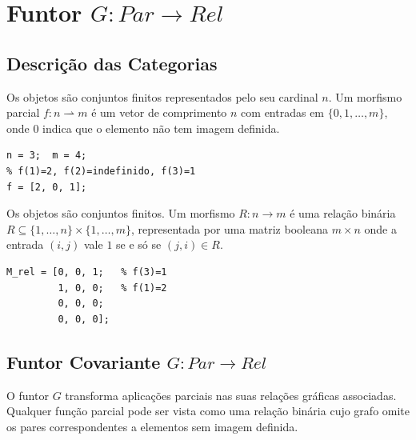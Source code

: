 \section{Funtor \texorpdfstring{$G: Par \to Rel$}{G: Par -> Rel}}
\label{sec:functor-par-rel}

\subsection{Descrição das Categorias}

\begin{definition}
Os objetos são conjuntos finitos representados pelo seu cardinal $n$. Um morfismo parcial $f: n \rightharpoonup m$ é um vetor de comprimento $n$ com entradas em $\{0, 1, \ldots, m\}$, onde $0$ indica que o elemento não tem imagem definida.
\end{definition}

\begin{lstlisting}[style=matlab, caption={Objeto e morfismo em $\mathbf{Par}$}]
n = 3;  m = 4;
% f(1)=2, f(2)=indefinido, f(3)=1
f = [2, 0, 1];
\end{lstlisting}

\begin{definition}
Os objetos são conjuntos finitos. Um morfismo $R: n \to m$ é uma relação binária $R \subseteq \{1,\ldots,n\} \times \{1,\ldots,m\}$, representada por uma matriz booleana $m \times n$ onde a entrada $(i,j)$ vale $1$ se e só se $(j, i) \in R$.
\end{definition}

\begin{lstlisting}[style=matlab, caption={Objeto e morfismo em $\mathbf{Rel}$}]
% Relacao R ⊆ {1,2,3} x {1,2,3,4}: matriz booleana 4x3
M_rel = [0, 0, 1;   % f(3)=1
         1, 0, 0;   % f(1)=2
         0, 0, 0;
         0, 0, 0];
\end{lstlisting}

\subsection{Funtor Covariante \texorpdfstring{$G: Par \to Rel$}{G: Par -> Rel}}

O funtor $G$ transforma aplicações parciais nas suas relações gráficas associadas. Qualquer função parcial pode ser vista como uma relação binária cujo grafo omite os pares correspondentes a elementos sem imagem definida.


